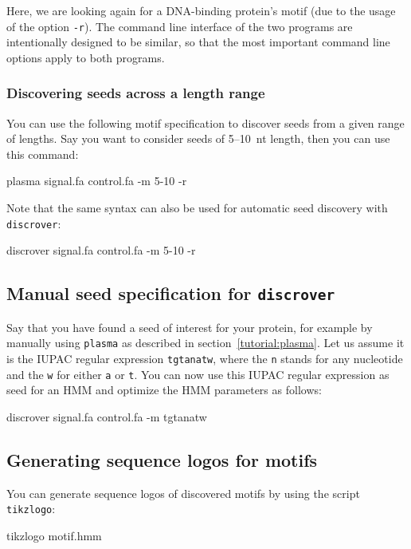 \documentclass[a4paper]{article}
\newcommand{\plasma}[0]{\texttt{plasma}}
\newcommand{\discrover}[0]{\texttt{discrover}}
\begin{document}
Here, we are looking again for a DNA-binding protein's motif (due to the usage of the option \verb|-r|).
The command line interface of the two programs are intentionally designed to be similar, so that the most important command line options apply to both programs.

\subsubsection{Discovering seeds across a length range}
You can use the following motif specification to discover seeds from a given range of lengths.
Say you want to consider seeds of 5--10~nt length, then you can use this command:\\
\begin{verbbox}
plasma signal.fa control.fa -m 5-10 -r
\end{verbbox}
\fbox{\theverbbox[t]}

Note that the same syntax can also be used for automatic seed discovery with \discrover{}:
\\
\begin{verbbox}
discrover signal.fa control.fa -m 5-10 -r
\end{verbbox}
\fbox{\theverbbox[t]}



\subsection{Manual seed specification for \discrover{}}
Say that you have found a seed of interest for your protein, for example by manually using \plasma{} as described in section~\ref{tutorial:plasma}.
Let us assume it is the IUPAC regular expression \verb|tgtanatw|, where the \verb|n| stands for any nucleotide and the \verb|w| for either \verb|a| or \verb|t|.
You can now use this IUPAC regular expression as seed for an HMM and optimize the HMM parameters as follows:\\
\begin{verbbox}
discrover signal.fa control.fa -m tgtanatw
\end{verbbox}
\fbox{\theverbbox[t]}


\subsection{Generating sequence logos for motifs}
You can generate sequence logos of discovered motifs by using the script \verb|tikzlogo|:\\
\begin{verbbox}
tikzlogo motif.hmm
\end{verbbox}
\fbox{\theverbbox[t]}
\end{document}
